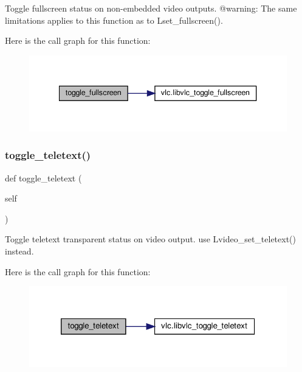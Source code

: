 \begin{DoxyVerb}Toggle fullscreen status on non-embedded video outputs.
@warning: The same limitations applies to this function
as to L{set_fullscreen}().
\end{DoxyVerb}
 Here is the call graph for this function\+:
\nopagebreak
\begin{figure}[H]
\begin{center}
\leavevmode
\includegraphics[width=340pt]{classvlc_1_1_media_player_aadd20ddbe69aacc041317f017debc750_cgraph}
\end{center}
\end{figure}
\mbox{\label{classvlc_1_1_media_player_ab7ff5c93b754829e1df408e1e79dd1ed}} 
\subsubsection{\texorpdfstring{toggle\+\_\+teletext()}{toggle\_teletext()}}
{\footnotesize\ttfamily def toggle\+\_\+teletext (\begin{DoxyParamCaption}\item[{}]{self }\end{DoxyParamCaption})}

\begin{DoxyVerb}Toggle teletext transparent status on video output.
\deprecated use L{video_set_teletext}() instead.
\end{DoxyVerb}
 Here is the call graph for this function\+:
\nopagebreak
\begin{figure}[H]
\begin{center}
\leavevmode
\includegraphics[width=320pt]{classvlc_1_1_media_player_ab7ff5c93b754829e1df408e1e79dd1ed_cgraph}
\end{center}
\end{figure}
\mbox{\label{classvlc_1_1_media_player_a91a961e8cb4b783a2042397f1bba6504}} 
